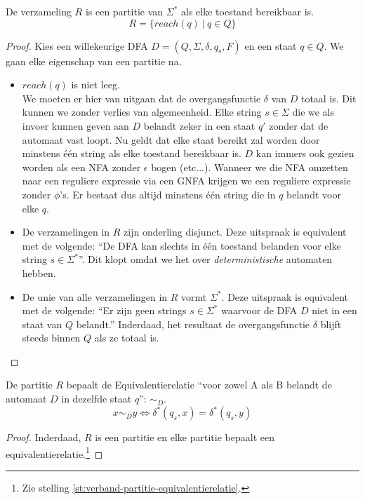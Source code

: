 \documentclass[main.tex]{subfiles}
\begin{document}
\begin{st}
  De verzameling $R$ is een partitie van $\Sigma^{*}$ als elke toestand bereikbaar is.
  \[ R = \{ reach(q)\ |\ q \in Q \} \]

  \begin{proof}
    Kies een willekeurige DFA $D = (Q,\Sigma,\delta,q_{s},F)$ en een staat $q\in Q$.
    We gaan elke eigenschap van een partitie na.
    \begin{itemize}
    \item $reach(q)$ is niet leeg.\\
      We moeten er hier van uitgaan dat de overgangsfunctie $\delta$ van $D$ totaal is.
      Dit kunnen we zonder verlies van algemeenheid.
      Elke string $s\in \Sigma$ die we als invoer kunnen geven aan $D$ belandt zeker in een staat $q'$ zonder dat de automaat vast loopt.
      Nu geldt dat elke staat bereikt zal worden door minstens \'e\'en string als elke toestand bereikbaar is.
      $D$ kan immers ook gezien worden als een NFA zonder $\epsilon$ bogen (etc...). Wanneer we die NFA omzetten naar een reguliere expressie via een GNFA krijgen we een reguliere expressie zonder $\phi$'s. Er bestaat dus altijd minstens \'e\'en string die in $q$ belandt voor elke $q$.
    \item De verzamelingen in $R$ zijn onderling disjunct.
      Deze uitspraak is equivalent met de volgende: ``De DFA kan slechts in \'e\'en toestand belanden voor elke string $s\in\Sigma^{*}$''. Dit klopt omdat we het over \emph{deterministische} automaten hebben.
    \item De unie van alle verzamelingen in $R$ vormt $\Sigma^{*}$.
      Deze uitspraak is equivalent met de volgende: ``Er zijn geen strings $s\in \Sigma^{*}$ waarvoor de DFA $D$ niet in een staat van $Q$ belandt.''
      Inderdaad, het resultaat de overgangsfunctie $\delta$ blijft steeds binnen $Q$ als ze totaal is.
    \end{itemize}
  \end{proof}
\end{st}

\begin{gev}
  De partitie $R$ bepaalt de Equivalentierelatie ``voor zowel A als B belandt de automaat $D$ in dezelfde staat $q$'': $\sim_{D}$.
  \[ x \sim_{D} y \Leftrightarrow \delta^{*}(q_{s},x) = \delta^{*}(q_{s},y) \]

  \begin{proof}
    Inderdaad, $R$ is een partitie en elke partitie bepaalt een equivalentierelatie.\footnote{Zie stelling \ref{st:verband-partitie-equivalentierelatie}.}
  \end{proof}
\end{gev}
\end{document}
